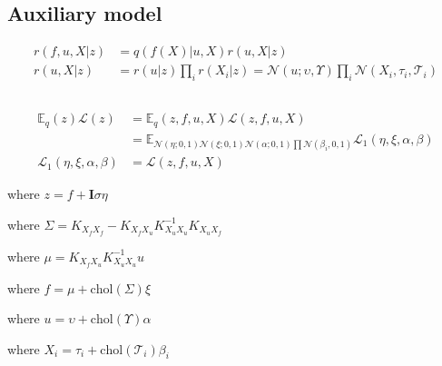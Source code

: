\documentclass[12pt]{article}
\newcommand{\Tau}{\mathcal{T}}
\newcommand{\Kff}{K_{X_fX_f}}
\newcommand{\Kuu}{K_{X_uX_u}}
\newcommand{\Kuf}{K_{X_uX_f}}
\newcommand{\Kfu}{K_{X_fX_u}}
\newcommand{\Ex}{\mathbb{E}}
\newcommand{\No}{\mathcal{N}}
\newcommand{\chol}{\mathrm{chol}}
\begin{document}
\subsection{Auxiliary model}
%
\begin{align}
    r(f,u,X|z) &= q(f(X)|u,X)r(u,X|z)\\
    r(u,X|z) &= r(u| z) \prod_i r(X_i|z) = \mathcal{N}(u; \upsilon, \Upsilon ) \prod_i \mathcal{N}( X_i, \tau_i, \Tau_i )
\end{align}



\subsection{}

\begin{align}
\Ex_q(z) \mathcal{L}(z) &= \Ex_q(z,f,u,X) \mathcal{L}(z,f,u,X) \\
&= \Ex_{\No(\eta;0,1)\No(\xi;0,1)\No(\alpha;0,1)\prod\No(\beta_i,0,1)} \mathcal{L}_1(\eta,\xi,\alpha,\beta) \\
\mathcal{L}_1(\eta,\xi,\alpha,\beta) &=  \mathcal{L}(z,f,u,X)
\end{align}

where  $z = f + \mathbf{I}\sigma\eta $

where $\Sigma = \Kff - \Kfu\Kuu^{-1}\Kuf$

where $\mu   = \Kfu\Kuu^{-1}u$

where $f = \mu + \chol(\Sigma)\xi $

where $u = \upsilon + \chol(\Upsilon)\alpha$

where $X_i = \tau_i + \chol(\Tau_i)\beta_i$
\end{document}
